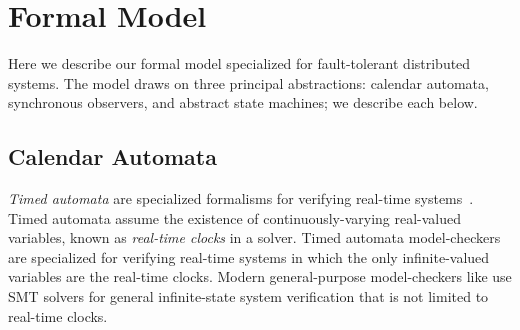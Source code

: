 \documentclass{llncs/llncs}
\newcommand{\lee}[1]{ } %
\newcommand{\lee}[1]{ {\color{blue}$<$lee: #1$>$} } %
\begin{document}

\lee{finish intro...  One more contribution is that we abstract faults using partially interpreted functions in model-checking, which is new? Note focus is on infinite-state model-checking: will need user-provided lemmas. compositional approach to providing lemmas. note verification interesting in its own right }



\section{Formal Model}\label{sec:model}
Here we describe our formal model specialized for fault-tolerant distributed systems. The model draws on three principal abstractions: calendar automata, synchronous observers, and abstract state machines; we describe each below.

\subsection{Calendar Automata}\label{sec:calendar}
\emph{Timed automata} are specialized formalisms for verifying real-time systems~\cite{}. Timed automata assume the existence of continuously-varying real-valued variables, known as \emph{real-time clocks} in a solver. Timed automata model-checkers are specialized for verifying real-time systems in which the only infinite-valued variables are the real-time clocks. Modern general-purpose model-checkers like \lee{name some} use SMT solvers for general infinite-state system verification that is not limited to real-time clocks.
\end{document}
